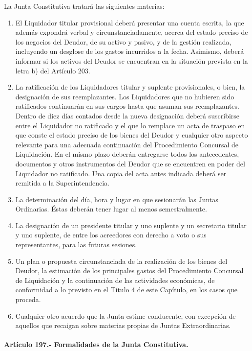 \documentclass[
]{book}
\begin{document}
La Junta Constitutiva tratará las siguientes materias:

\begin{enumerate}
\def\labelenumi{\arabic{enumi})}
\item
  El Liquidador titular provisional deberá presentar una cuenta escrita, la que además expondrá verbal y circunstanciadamente, acerca del estado preciso de los negocios del Deudor, de su activo y pasivo, y de la gestión realizada, incluyendo un desglose de los gastos incurridos a la fecha. Asimismo, deberá informar si los activos del Deudor se encuentran en la situación prevista en la letra b) del Artículo 203.
\item
  La ratificación de los Liquidadores titular y suplente provisionales, o bien, la designación de sus reemplazantes. Los Liquidadores que no hubieren sido ratificados continuarán en sus cargos hasta que asuman sus reemplazantes. Dentro de diez días contados desde la nueva designación deberá suscribirse entre el Liquidador no ratificado y el que lo remplace un acta de traspaso en que conste el estado preciso de los bienes del Deudor y cualquier otro aspecto relevante para una adecuada continuación del Procedimiento Concursal de Liquidación. En el mismo plazo deberán entregarse todos los antecedentes, documentos y otros instrumentos del Deudor que se encuentren en poder del Liquidador no ratificado. Una copia del acta antes indicada deberá ser remitida a la Superintendencia.
\item
  La determinación del día, hora y lugar en que sesionarán las Juntas Ordinarias. Éstas deberán tener lugar al menos semestralmente.
\item
  La designación de un presidente titular y uno suplente y un secretario titular y uno suplente, de entre los acreedores con derecho a voto o sus representantes, para las futuras sesiones.
\item
  Un plan o propuesta circunstanciada de la realización de los bienes del Deudor, la estimación de los principales gastos del Procedimiento Concursal de Liquidación y la continuación de las actividades económicas, de conformidad a lo previsto en el Título 4 de este Capítulo, en los casos que proceda.
\item
  Cualquier otro acuerdo que la Junta estime conducente, con excepción de aquellos que recaigan sobre materias propias de Juntas Extraordinarias.
\end{enumerate}

\hypertarget{artuxedculo-197.--formalidades-de-la-junta-constitutiva.}{%
\paragraph*{Artículo 197.- Formalidades de la Junta Constitutiva.}\label{artuxedculo-197.--formalidades-de-la-junta-constitutiva.}}
\end{document}
